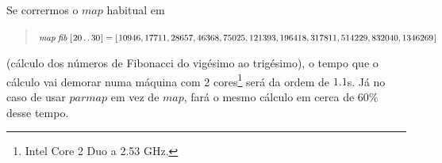 \documentclass[a4paper]{article}
\newcommand{\Varid}[1]{\mathit{#1}}
\begin{document}
Se corrermos o \ensuremath{\Varid{map}} habitual em
\begin{quote}
\ensuremath{\Varid{map}\;\Varid{fib}\;[\mskip1.5mu \mathrm{20}\mathinner{\ldotp\ldotp}\mathrm{30}\mskip1.5mu]\mathrel{=}[\mskip1.5mu \mathrm{10946},\mathrm{17711},\mathrm{28657},\mathrm{46368},\mathrm{75025},\mathrm{121393},\mathrm{196418},\mathrm{317811},\mathrm{514229},\mathrm{832040},\mathrm{1346269}\mskip1.5mu]}
\end{quote}
(cálculo dos números de Fibonacci do vigésimo ao trigésimo), o tempo que
o cálculo vai demorar numa máquina com 2 cores\footnote{Intel Core 2 Duo
a 2.53 GHz.} será da ordem de \ensuremath{\mathrm{1.1}}s. Já no caso de usar \ensuremath{\Varid{parmap}}
em vez de \ensuremath{\Varid{map}}, fará o mesmo cálculo em cerca de \ensuremath{\mathrm{60}\mathbin{\%}} desse tempo.
\end{document}
